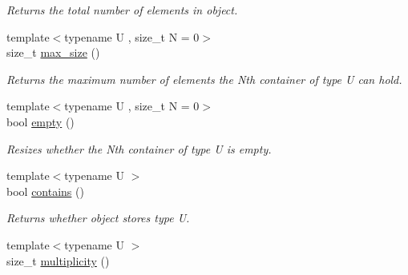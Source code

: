 \begin{DoxyCompactItemize}
\begin{DoxyCompactList}\small\item\em Returns the total number of elements in object. \end{DoxyCompactList}\item 
\hypertarget{classheterogeneous_1_1heteroforward__list_3_01_t_00_01_types_8_8_8_4_aa481b40886e30c5eb4d5ff16dc700bcc}{}{\footnotesize template$<$typename U , size\+\_\+t N = 0$>$ }\\size\+\_\+t \hyperlink{classheterogeneous_1_1heteroforward__list_3_01_t_00_01_types_8_8_8_4_aa481b40886e30c5eb4d5ff16dc700bcc}{max\+\_\+size} ()\label{classheterogeneous_1_1heteroforward__list_3_01_t_00_01_types_8_8_8_4_aa481b40886e30c5eb4d5ff16dc700bcc}

\begin{DoxyCompactList}\small\item\em Returns the maximum number of elements the Nth container of type U can hold. \end{DoxyCompactList}\item 
\hypertarget{classheterogeneous_1_1heteroforward__list_3_01_t_00_01_types_8_8_8_4_a280d2fe7ae6ee2bb8622e99154d01717}{}{\footnotesize template$<$typename U , size\+\_\+t N = 0$>$ }\\bool \hyperlink{classheterogeneous_1_1heteroforward__list_3_01_t_00_01_types_8_8_8_4_a280d2fe7ae6ee2bb8622e99154d01717}{empty} ()\label{classheterogeneous_1_1heteroforward__list_3_01_t_00_01_types_8_8_8_4_a280d2fe7ae6ee2bb8622e99154d01717}

\begin{DoxyCompactList}\small\item\em Resizes whether the Nth container of type U is empty. \end{DoxyCompactList}\item 
\hypertarget{classheterogeneous_1_1heteroforward__list_3_01_t_00_01_types_8_8_8_4_a558f00ca1634dacfd61423ba8ca4417d}{}{\footnotesize template$<$typename U $>$ }\\bool \hyperlink{classheterogeneous_1_1heteroforward__list_3_01_t_00_01_types_8_8_8_4_a558f00ca1634dacfd61423ba8ca4417d}{contains} ()\label{classheterogeneous_1_1heteroforward__list_3_01_t_00_01_types_8_8_8_4_a558f00ca1634dacfd61423ba8ca4417d}

\begin{DoxyCompactList}\small\item\em Returns whether object stores type U. \end{DoxyCompactList}\item 
\hypertarget{classheterogeneous_1_1heteroforward__list_3_01_t_00_01_types_8_8_8_4_a0233842cce8c1e97bf7654c61d12b13e}{}{\footnotesize template$<$typename U $>$ }\\size\+\_\+t \hyperlink{classheterogeneous_1_1heteroforward__list_3_01_t_00_01_types_8_8_8_4_a0233842cce8c1e97bf7654c61d12b13e}{multiplicity} ()\label{classheterogeneous_1_1heteroforward__list_3_01_t_00_01_types_8_8_8_4_a0233842cce8c1e97bf7654c61d12b13e}


\end{DoxyCompactItemize}
